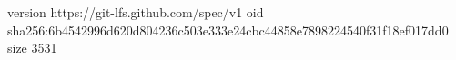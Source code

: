 version https://git-lfs.github.com/spec/v1
oid sha256:6b4542996d620d804236c503e333e24cbc44858e7898224540f31f18ef017dd0
size 3531
